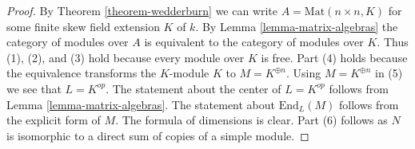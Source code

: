 \documentclass[10pt,a4paper]{amsart}
\theoremstyle{plain}
\theoremstyle{definition}
\theoremstyle{remark}
\numberwithin{equation}{subsection}
\begin{document}
\begin{proof}
By
Theorem \ref{theorem-wedderburn}
we can write $A = \text{Mat}(n \times n, K)$ for some finite skew
field extension $K$ of $k$. By
Lemma \ref{lemma-matrix-algebras}
the category of modules over $A$ is equivalent to the category of
modules over $K$. Thus (1), (2), and (3) hold
because every module over $K$ is free. Part (4) holds
because the equivalence transforms the $K$-module $K$
to $M = K^{\oplus n}$. Using $M = K^{\oplus n}$ in (5)
we see that $L = K^{op}$. The statement about the center of $L = K^{op}$
follows from
Lemma \ref{lemma-matrix-algebras}.
The statement about $\text{End}_L(M)$ follows from the explicit form
of $M$. The formula of dimensions is clear.
Part (6) follows as $N$ is isomorphic to a direct sum of
copies of a simple module.
\end{proof}
\end{document}
